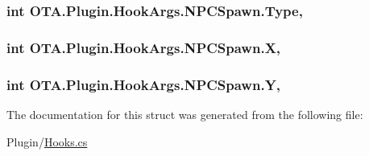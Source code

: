 \subsubsection[{Type}]{\setlength{\rightskip}{0pt plus 5cm}int O\+T\+A.\+Plugin.\+Hook\+Args.\+N\+P\+C\+Spawn.\+Type\hspace{0.3cm}{\ttfamily [get]}, {\ttfamily [set]}}\label{struct_o_t_a_1_1_plugin_1_1_hook_args_1_1_n_p_c_spawn_a3ecc50200fda7aa41146847c2e03e1e5}
\hypertarget{struct_o_t_a_1_1_plugin_1_1_hook_args_1_1_n_p_c_spawn_adb95441703d6e9cf1aa9f675d91f2e3e}{}
\subsubsection[{X}]{\setlength{\rightskip}{0pt plus 5cm}int O\+T\+A.\+Plugin.\+Hook\+Args.\+N\+P\+C\+Spawn.\+X\hspace{0.3cm}{\ttfamily [get]}, {\ttfamily [set]}}\label{struct_o_t_a_1_1_plugin_1_1_hook_args_1_1_n_p_c_spawn_adb95441703d6e9cf1aa9f675d91f2e3e}
\hypertarget{struct_o_t_a_1_1_plugin_1_1_hook_args_1_1_n_p_c_spawn_a1fa1a26464e13964d81c7815dba2c264}{}
\subsubsection[{Y}]{\setlength{\rightskip}{0pt plus 5cm}int O\+T\+A.\+Plugin.\+Hook\+Args.\+N\+P\+C\+Spawn.\+Y\hspace{0.3cm}{\ttfamily [get]}, {\ttfamily [set]}}\label{struct_o_t_a_1_1_plugin_1_1_hook_args_1_1_n_p_c_spawn_a1fa1a26464e13964d81c7815dba2c264}


The documentation for this struct was generated from the following file\+:\begin{DoxyCompactItemize}
\item 
Plugin/\hyperlink{_hooks_8cs}{Hooks.\+cs}\end{DoxyCompactItemize}
